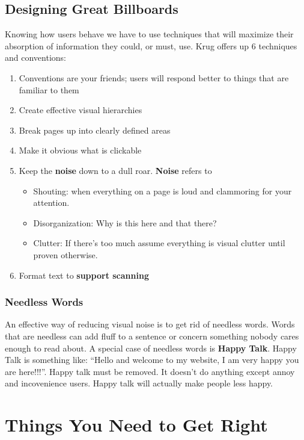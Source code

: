 \documentclass{article}%
\begin{document}
\subsection{Designing Great Billboards}
  Knowing how users behave we have to use techniques that will maximize their
  absorption of information they could, or must, use. \newline
  Krug offers up 6 techniques and conventions:
  \begin{enumerate}
    \item Conventions are your friends; users will respond better to things that are familiar to them
    \item Create effective visual hierarchies
    \item Break pages up into clearly defined areas
    \item Make it obvious what is clickable
    \item Keep the \textbf{noise} down to a dull roar. \textbf{Noise} refers to
      \begin{itemize}
        \item Shouting: when everything on a page is loud and clammoring for your attention.
        \item Disorganization: Why is this here and that there?
        \item Clutter: If there's too much assume everything is visual clutter until proven otherwise.
      \end{itemize}
    \item Format text to \textbf{support scanning}
  \end{enumerate}
  \subsubsection{Needless Words}
  An effective way of reducing visual noise is to get rid of needless words.
  Words that are needless can add fluff to a sentence or concern something nobody cares
  enough to read about. \newline
  A special case of needless words is \textbf{Happy Talk}. Happy Talk is something like:\newline
  ``Hello and welcome to my website, I am very happy you are here!!!''. Happy talk must be removed.
  It doesn't do anything except annoy and incovenience users. Happy talk will actually make people less happy.
%
\section{Things You Need to Get Right}%
\label{sec:Things You Need to Get Right}%
\end{document}
